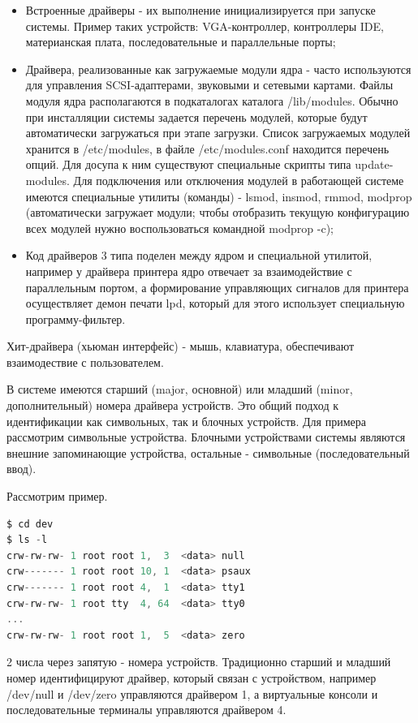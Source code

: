\documentclass[12pt,a4paper]{scrreprt}
\begin{document}
\begin{itemize}
	\item Встроенные драйверы - их выполнение инициализируется при запуске системы. Пример таких устройств: VGA-контроллер, контроллеры IDE, материанская плата, последовательные и параллельные порты;
	\item Драйвера, реализованные как загружаемые модули ядра - часто используются для управления SCSI-адаптерами, звуковыми и сетевыми картами. Файлы модуля ядра располагаются в подкаталогах каталога /lib/modules. Обычно при инсталляции системы задается перечень модулей, которые будут автоматически загружаться при этапе загрузки. Список загружаемых модулей хранится в /etc/modules, в файле /etc/modules.conf находится перечень опций. Для досупа к ним существуют специальные скрипты типа update-modules. Для подключения или отключения модулей в работающей системе имеются специальные утилиты (команды) - lsmod, insmod, rmmod, modprop (автоматически загружает модули; чтобы отобразить текущую конфигурацию всех модулей нужно воспользоваться командной modprop -c);
	\item Код драйверов 3 типа поделен между ядром и специальной утилитой, например у драйвера принтера ядро отвечает за взаимодействие с параллельным портом, а формирование управляющих сигналов для принтера осуществляет демон печати lpd, который для этого использует специальную программу-фильтер.
\end{itemize}

Хит-драйвера (хьюман интерфейс) - мышь, клавиатура, обеспечивают взаимодествие с пользователем.

В системе имеются старший (major, основной) или младший (minor, дополнительный) номера драйвера устройств. Это общий подход к идентификации как символьных, так и блочных устройств. Для примера рассмотрим символьные устройства. Блочными устройствами системы являются внешние запоминающие устройства, остальные - символьные (последовательный ввод).

Рассмотрим пример. 

\begin{lstlisting}[language=C]
$ cd dev
$ ls -l
crw-rw-rw- 1 root root 1,  3  <data> null
crw------- 1 root root 10, 1  <data> psaux
crw------- 1 root root 4,  1  <data> tty1
crw-rw-rw- 1 root tty  4, 64  <data> tty0
...
crw-rw-rw- 1 root root 1,  5  <data> zero
\end{lstlisting}

2 числа через запятую - номера устройств. Традиционно старший и младший номер идентифицируют драйвер, который связан с устройством, например /dev/null и /dev/zero управляются драйвером 1, а виртуальные консоли и последовательные терминалы управляются драйвером 4.
\end{document}
